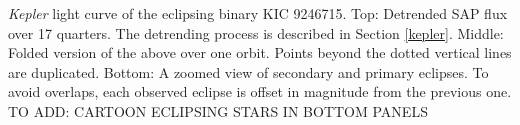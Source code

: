 \label{fig:keplerfig} \emph{Kepler} light curve of the eclipsing binary KIC 9246715. Top: Detrended SAP flux over 17 quarters. The detrending process is described in Section \ref{kepler}. Middle: Folded version of the above over one orbit. Points beyond the dotted vertical lines are duplicated. Bottom: A zoomed view of secondary and primary eclipses. To avoid overlaps, each observed eclipse is offset in magnitude from the previous one. TO ADD: CARTOON ECLIPSING STARS IN BOTTOM PANELS